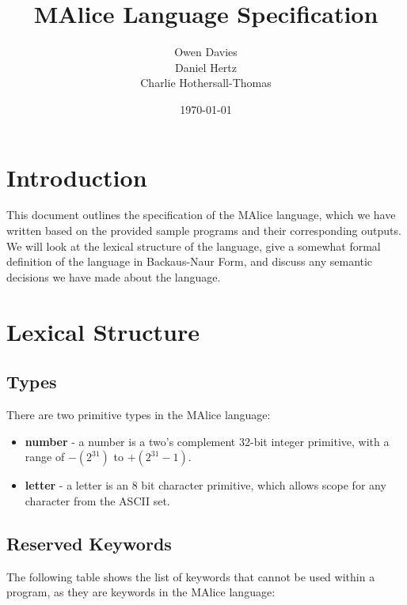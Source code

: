 \documentclass[a4, 11pt]{article}
\begin{document}
\title{\huge{MAlice Language Specification}}
\author{Owen Davies\\Daniel Hertz\\Charlie Hothersall-Thomas}
\date{\today}

\maketitle

\section*{Introduction}
This document outlines the specification of the MAlice language, which we have written based on the provided sample programs and their corresponding outputs. We will look at the lexical structure of the language, give a somewhat formal definition of the language in Backaus-Naur Form, and discuss any semantic decisions we have made about the language.

\section*{Lexical Structure}
\subsection*{Types}
There are two primitive types in the MAlice language:

\begin{itemize}
  \item \textbf{number} - a number is a two's complement 32-bit integer 
  primitive, with a range of \( -(2^{31}) \) to \( +(2^{31} - 1) \). 
  \item \textbf{letter} - a letter is an 8 bit character primitive, which 
  allows scope for any character from the ASCII set.
\end{itemize}

\subsection*{Reserved Keywords}
The following table shows the list of keywords that cannot be used within a program, as they are keywords in the MAlice language:
\end{document}
